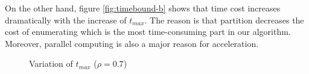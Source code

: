On the other hand, figure \ref{fig:timebound-b} shows that
time cost increases dramatically  with the increase of  $t_{max}$.
The reason is that  partition  decreases the cost of enumerating \qids which
is the most time-consuming part in our algorithm. Moreover, parallel
computing is also a major reason for acceleration.





\begin{figure}[th]
\flushleft
{}
\caption{Variation of $t_{max}$ ($\rho = 0.7$)}\label{fig:timebound}
\end{figure}

